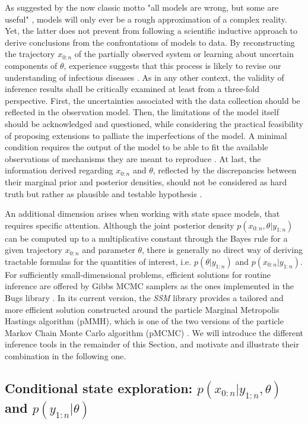 \documentclass[a4paper,11pt,titlepage]{article}
\theoremstyle{plain} %
\begin{document}
As suggested by the now classic motto "all models are wrong, but some are useful" \citep{Box1987}, models will only ever be a rough approximation of a complex reality. Yet, the latter does not prevent from following a scientific inductive approach to derive conclusions from the confrontations of models to data. By reconstructing the trajectory $x_{0:n}$ of the partially observed system or learning about uncertain components of $\theta$, experience suggests that this process is likely to revise our understanding of infectious diseases \citep{King2008}.  As in any other context, the validity of inference results shall be critically examined at least from a three-fold perspective. First, the uncertainties associated with the data collection should be reflected in the observation model. Then, the limitations of the model itself should be acknowledged and questioned, while considering the practical feasibility of  proposing extensions to palliate the imperfections of the model. A minimal condition requires the output of the model to be able to fit the available observations of mechanisms they are meant to reproduce \citep{Gelman2012}. At last, the information derived regarding $x_{0:n}$  and  $\theta$, reflected by the discrepancies between their marginal prior and posterior densities, should not be considered as hard truth but rather as plausible and testable hypothesis  \citep{Popper2002}. 


An additional dimension arises when working with state space models, that requires specific attention. Although the joint posterior density $p(x_{0:n},\theta|y_{1:n})$ can  be computed  up to a multiplicative constant through the Bayes rule for a given trajectory $x_{0:n}$ and parameter $\theta$, there is generally no direct way of deriving tractable formulas for the quantities of interest, i.e. $p(\theta|y_{1:n})$ and $p(x_{0:n}|y_{1:n})$. For sufficiently small-dimensional problems, efficient solutions for routine inference are offered by Gibbs MCMC samplers as the ones implemented in the Bugs library \citep{Lunn2000}. In its current version, the \emph{SSM} library provides a tailored and more efficient  solution constructed around the particle Marginal Metropolis Hastings algorithm (pMMH), which is one of the two versions of the particle Markov Chain Monte Carlo algorithm (pMCMC) \citep{Andrieu2010}. We will introduce the different inference tools in the remainder of this Section, and motivate and illustrate their combination in the following one.


\subsection{Conditional state exploration: $p(x_{0:n}|y_{1:n},\theta)$ and $p(y_{1:n}|\theta)$}
\end{document}
